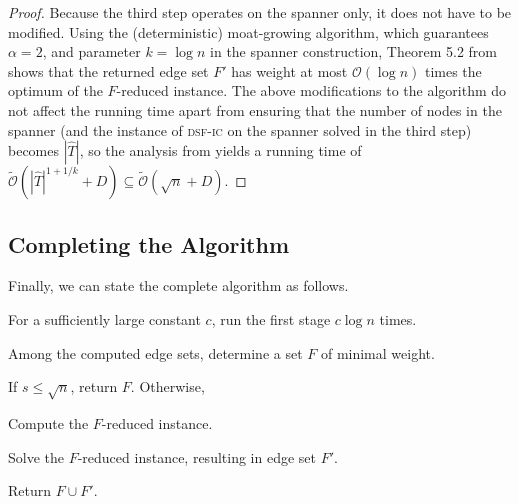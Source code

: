 \documentclass[letterpaper,11pt]{article}
\newcommand{\BO}{\mathcal{O}}
\newcommand{\sO}{\tilde{\mathcal{O}}}
\newcommand{\sfic}{\textsc{dsf-ic}\xspace}
\begin{document}
\begin{proof}
Because the third step operates on the spanner only, it does not have to be
modified. Using the (deterministic) moat-growing algorithm, which guarantees
$\alpha=2$, and parameter $k=\log n$ in the spanner construction, Theorem 5.2
from \cite{LenzenP13} shows that the returned edge set $F'$ has weight at most
$\BO(\log n)$ times the optimum of the $F$-reduced instance. The above
modifications to the algorithm do not affect the running time apart from
ensuring that the number of nodes in the spanner (and the instance of \sfic on
the spanner solved in the third step) becomes $|\hat{T}|$, so the analysis from
\cite{LenzenP13} yields a running time of $\sO(|\hat{T}|^{1+1/k}+D)\subseteq
\sO(\sqrt{n}+D)$.
\end{proof}

\subsection{Completing the Algorithm}

Finally, we can state the complete algorithm as follows.
\begin{compactenum}
\item For a sufficiently large constant $c$, run the first stage $c\log n$
times.
\item Among the computed edge sets, determine a set $F$ of minimal weight.
\item If $s\leq \sqrt{n}$, return $F$. Otherwise,
\begin{compactenum}
\item Compute the $F$-reduced instance.
\item Solve the $F$-reduced instance, resulting in edge set $F'$.
\item Return $F\cup F'$.
\end{compactenum}
\end{compactenum}
\end{document}
